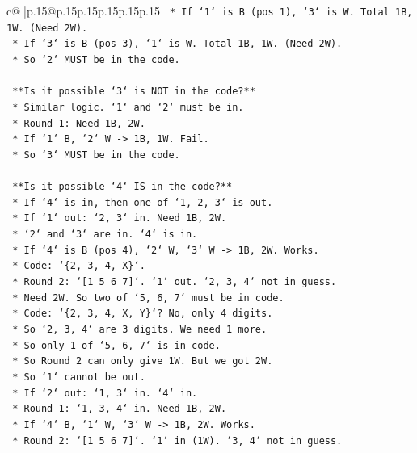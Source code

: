 \documentclass{article}
\begin{document}
{\begin{supertabular}{c@{$\;$}|p{.15\linewidth}@{}p{.15\linewidth}p{.15\linewidth}p{.15\linewidth}p{.15\linewidth}p{.15\linewidth}}
{{{\texttt{    *   If `1` is B (pos 1), `3` is W. Total 1B, 1W. (Need 2W).} \\
\texttt{    *   If `3` is B (pos 3), `1` is W. Total 1B, 1W. (Need 2W).} \\
\texttt{    *   So `2` MUST be in the code.} \\
\\ 
\texttt{    **Is it possible `3` is NOT in the code?**} \\
\texttt{    *   Similar logic. `1` and `2` must be in.} \\
\texttt{    *   Round 1: Need 1B, 2W.} \\
\texttt{    *   If `1` B, `2` W {-}> 1B, 1W. Fail.} \\
\texttt{    *   So `3` MUST be in the code.} \\
\\ 
\texttt{    **Is it possible `4` IS in the code?**} \\
\texttt{    *   If `4` is in, then one of `1, 2, 3` is out.} \\
\texttt{    *   If `1` out: `2, 3` in. Need 1B, 2W.} \\
\texttt{        *   `2` and `3` are in. `4` is in.} \\
\texttt{        *   If `4` is B (pos 4), `2` W, `3` W {-}> 1B, 2W. Works.} \\
\texttt{        *   Code: `\{2, 3, 4, X\}`.} \\
\texttt{        *   Round 2: `{[}1 5 6 7{]}`. `1` out. `2, 3, 4` not in guess.} \\
\texttt{        *   Need 2W. So two of `5, 6, 7` must be in code.} \\
\texttt{        *   Code: `\{2, 3, 4, X, Y\}`? No, only 4 digits.} \\
\texttt{        *   So `2, 3, 4` are 3 digits. We need 1 more.} \\
\texttt{        *   So only 1 of `5, 6, 7` is in code.} \\
\texttt{        *   So Round 2 can only give 1W. But we got 2W.} \\
\texttt{        *   So `1` cannot be out.} \\
\texttt{    *   If `2` out: `1, 3` in. `4` in.} \\
\texttt{        *   Round 1: `1, 3, 4` in. Need 1B, 2W.} \\
\texttt{        *   If `4` B, `1` W, `3` W {-}> 1B, 2W. Works.} \\
\texttt{        *   Round 2: `{[}1 5 6 7{]}`. `1` in (1W). `3, 4` not in guess.} \\
}}}
\end{supertabular}}
\end{document}
